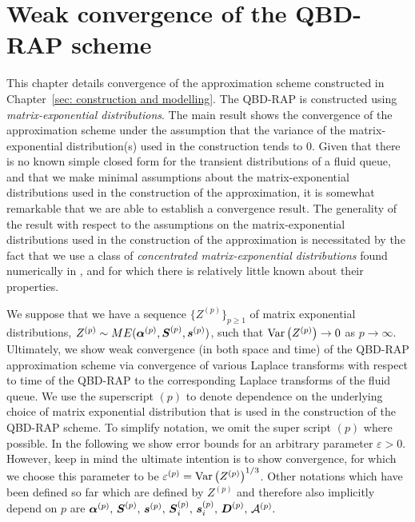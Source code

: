 \chapter{Weak convergence of the QBD-RAP scheme\label{sec: conv}}
This chapter details convergence of the approximation scheme constructed in Chapter~\ref{sec: construction and modelling}. The QBD-RAP is constructed using \emph{matrix-exponential distributions}. The main result shows the convergence of the approximation scheme under the assumption that the variance of the matrix-exponential distribution(s) used in the construction tends to 0. Given that there is no known simple closed form for the transient distributions of a fluid queue, and that we make minimal assumptions about the matrix-exponential distributions used in the construction of the approximation, it is somewhat remarkable that we are able to establish a convergence result. The generality of the result with respect to the assumptions on the matrix-exponential distributions used in the construction of the approximation is necessitated by the fact that we use a class of \emph{concentrated matrix-exponential distributions} found numerically in \citep{hht2020}, and for which there is relatively little known about their properties.

We suppose that we have a sequence \(\{Z^{(p)}\}_{p\geq 1}\) of matrix exponential distributions, \(Z^{(p)}\sim ME(\boldsymbol\alpha^{(p)},\boldsymbol S^{(p)}, \boldsymbol s^{(p)})\), such that \(\mathrm{Var}\left(Z^{(p)}\right)\to 0 \) as \(p\to \infty\). Ultimately, we show weak convergence (in both space and time) of the QBD-RAP approximation scheme via convergence of various Laplace transforms with respect to time of the QBD-RAP to the corresponding Laplace transforms of the fluid queue. We use the superscript \((p)\) to denote dependence on the underlying choice of matrix exponential distribution that is used in the construction of the QBD-RAP scheme. To simplify notation, we omit the super script \((p)\) where possible. In the following we show error bounds for an arbitrary parameter \(\varepsilon>0\). However, keep in mind the ultimate intention is to show convergence, for which we choose this parameter to be \(\varepsilon^{(p)}=\mathrm{Var}\left(Z^{(p)}\right)^{1/3}\). Other notations which have been defined so far which are defined by \(Z^{(p)}\) and therefore also implicitly depend on \(p\) are \(\boldsymbol\alpha^{(p)},\,\boldsymbol S^{(p)},\,\boldsymbol s^{(p)},\, \boldsymbol S_i^{(p)},\, \boldsymbol s_i^{(p)},\, \boldsymbol D^{(p)},\,\mathcal A^{(p)}.\)

